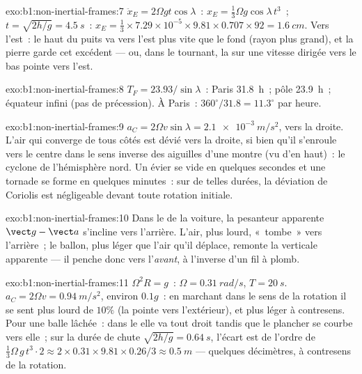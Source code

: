 \begin{solution}{exo:b1:non-inertial-frames:7}
$\ddot x_E = 2\Omega gt\cos\lambda$~: $x_E = \tfrac13\Omega g\cos\lambda\,t^3$~; $t =
\sqrt{2h/g} = \qty{4.5}{s}$~: $x_E = \tfrac13 \times 7.29\times10^{-5} \times 9.81
\times 0.707 \times 92 = \qty{1.6}{cm}$. Vers l'est~: le haut du puits va
vers l'est plus vite que le fond (rayon plus grand), et la pierre garde
cet excédent --- ou, dans le  tournant, la 
sur une vitesse dirigée vers le bas pointe vers l'est.
\end{solution}

\begin{solution}{exo:b1:non-inertial-frames:8}
$T_F = 23.93/\sin\lambda$~: Paris \qty{31.8}{h}~; pôle \qty{23.9}{h}~;
équateur infini (pas de précession). À Paris~: $360^\circ/31.8 = 11.3^\circ$ par heure.
\end{solution}

\begin{solution}{exo:b1:non-inertial-frames:9}
$a_C = 2\Omega v\sin\lambda = \qty{2.1e-3}{m/s^2}$, vers la droite. L'air
qui converge de tous côtés est dévié vers la droite, si bien qu'il
s'enroule vers le centre dans le sens inverse des aiguilles d'une montre
(vu d'en haut)~: le cyclone de l'hémisphère nord. Un évier se vide en
quelques secondes et une tornade se forme en quelques minutes~: sur de
telles durées, la déviation de Coriolis est négligeable devant toute
rotation initiale.
\end{solution}

\begin{solution}{exo:b1:non-inertial-frames:10}
Dans le  de la voiture, la pesanteur apparente
$\vect g - \vect a$ s'incline vers l'arrière. L'air, plus lourd, «~tombe~»
vers l'arrière~; le ballon, plus léger que l'air qu'il déplace, remonte
la verticale apparente --- il penche donc vers l'\emph{avant}, à
l'inverse d'un fil à plomb.
\end{solution}

\begin{solution}{exo:b1:non-inertial-frames:11}
$\Omega^2R = g$~: $\Omega = \qty{0.31}{rad/s}$, $T = \qty{20}{s}$. $a_C = 2\Omega v
= \qty{0.94}{m/s^2}$, environ $0.1g$~: en marchant dans le sens de la
rotation il se sent plus lourd de $10\%$ (la  pointe
vers l'extérieur), et plus léger à contresens. Pour une balle lâchée~:
dans le  elle va tout droit tandis que le plancher
se courbe vers elle~; sur la durée de chute $\sqrt{2h/g} = \qty{0.64}{s}$, l'écart
est de l'ordre de $\tfrac13\Omega\,g\,t^3 \cdot 2 \approx 2 \times 0.31 \times
9.81 \times 0.26/3 \approx \qty{0.5}{m}$ --- quelques décimètres, à
contresens de la rotation.
\end{solution}

